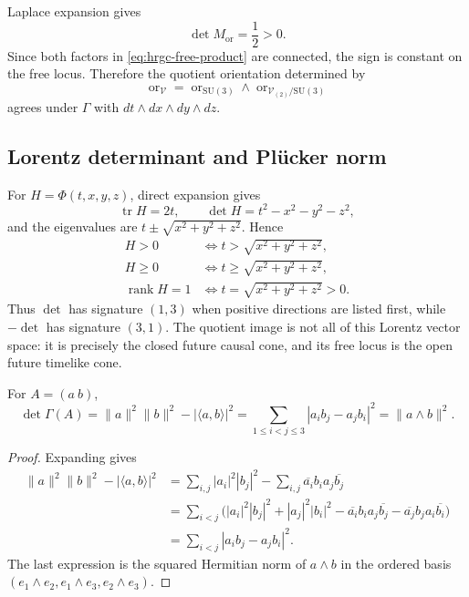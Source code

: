 \endgroup
Laplace expansion gives
\begin{equation}
 \det M_{\mathrm{or}}=\frac12>0.
 \label{eq:hrgc-orientation-determinant}
\end{equation}
Since both factors in \eqref{eq:hrgc-free-product} are connected, the sign is
constant on the free locus.  Therefore the quotient orientation determined
by
\[
 \operatorname{or}_{\mathscr V}
 =\operatorname{or}_{\mathrm{SU}(3)}\wedge
  \operatorname{or}_{\mathscr V_{(2)}/\mathrm{SU}(3)}
\]
agrees under \(\Gamma\) with
\(dt\wedge dx\wedge dy\wedge dz\).

\subsection{Lorentz determinant and Pl\"ucker norm}

For \(H=\Phi(t,x,y,z)\), direct expansion gives
\begin{equation}
 \operatorname{tr}H=2t,
 \qquad
 \det H=t^2-x^2-y^2-z^2,
 \label{eq:hrgc-lorentz-determinant}
\end{equation}
and the eigenvalues are
\(t\pm\sqrt{x^2+y^2+z^2}\).  Hence
\begin{equation}
 \begin{aligned}
 H>0&\Longleftrightarrow t>\sqrt{x^2+y^2+z^2},\\
 H\geq0&\Longleftrightarrow t\geq\sqrt{x^2+y^2+z^2},\\
 \operatorname{rank}H=1&\Longleftrightarrow
 t=\sqrt{x^2+y^2+z^2}>0.
 \end{aligned}
 \label{eq:hrgc-positive-cone-inequalities}
\end{equation}
Thus \(\det\) has signature \((1,3)\) when positive directions are listed
first, while \(-\det\) has signature \((3,1)\).  The quotient image is not
all of this Lorentz vector space: it is precisely the closed future causal
cone, and its free locus is the open future timelike cone.

\begin{proposition}
\label{prop:hrgc-pluecker}
For \(A=(a\ b)\),
\begin{equation}
 \det\Gamma(A)
 =\lVert a\rVert^2\lVert b\rVert^2-|\langle a,b\rangle|^2
 =\sum_{1\leq i<j\leq3}|a_ib_j-a_jb_i|^2
 =\lVert a\wedge b\rVert^2.
 \label{eq:hrgc-pluecker-identity}
\end{equation}
\end{proposition}

\begin{proof}
Expanding gives
\begin{align*}
 \lVert a\rVert^2\lVert b\rVert^2-|\langle a,b\rangle|^2
 &=\sum_{i,j}|a_i|^2|b_j|^2
   -\sum_{i,j}\overline{a_i}b_i a_j\overline{b_j}\\
 &=\sum_{i<j}
 \bigl(|a_i|^2|b_j|^2+|a_j|^2|b_i|^2
 -\overline{a_i}b_i a_j\overline{b_j}
 -\overline{a_j}b_j a_i\overline{b_i}\bigr)\\
 &=\sum_{i<j}|a_ib_j-a_jb_i|^2.
\end{align*}
The last expression is the squared Hermitian norm of \(a\wedge b\) in the
ordered basis
\((e_1\wedge e_2,e_1\wedge e_3,e_2\wedge e_3)\).
\end{proof}

